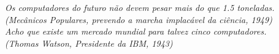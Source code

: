 
\begin{epigrafe}
  \vspace*{\fill}
  \begin{flushright}
    \textit{Os computadores do futuro não devem pesar mais do que \num{1,5} toneladas. \\
           (Mecânicos Populares, prevendo a marcha implacável da ciência, 1949) \\[4mm]
           Acho que existe um mercado mundial para talvez cinco computadores. \\
           (Thomas Watson, Presidente da IBM, 1943)}
  \end{flushright}
\end{epigrafe}

\cleardoublepage

